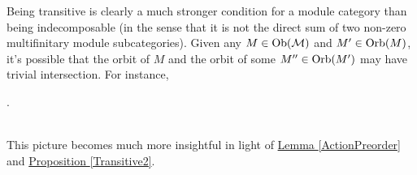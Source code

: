 \noindent Being transitive is clearly a much stronger condition for a module category than being indecomposable (in the sense that it is not the direct sum of two non-zero multifinitary module subcategories). Given any $M \in \textnormal{Ob}(\mathcal{M})$ and $M' \in \textnormal{Orb}(M)$, it's possible that the orbit of $M$ and the orbit of some $M'' \in \textnormal{Orb}(M')$ may have trivial intersection. For instance,\\[-0.5\linespacing]
\begin{center}
.
\end{center}
\noindent\\ This picture becomes much more insightful in light of \hyperref[ActionPreorder]{Lemma \ref*{ActionPreorder}} and \hyperref[Transitive2]{Proposition \ref*{Transitive2}}.\\



